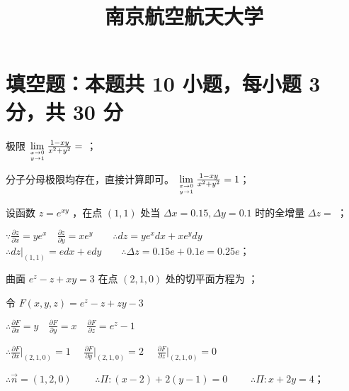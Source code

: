 \documentclass{exam-zh}
\title{南京航空航天大学}
\begin{document}
\maketitle

\section{填空题：本题共 10 小题，每小题 3 分，共 30 分}
\scoringbox

\begin{question}[points = 3]
    极限 $\lim\limits_{x \to 0 \atop y \to 1} \frac{1 - xy}{x^2 + y^2} = $ \fillin[1]；
\end{question}
\begin{solution}
    分子分母极限均存在，直接计算即可。 $\lim\limits_{x \to 0 \atop y \to 1} \frac{1 - xy}{x^2 + y^2} = 1$；
\end{solution}

\begin{question}[points = 3]
    设函数 $z = e^{xy}$ ，在点 $(1, 1)$ 处当 $\Delta x = 0.15, \Delta y = 0.1$ 时的全增量 $\Delta z = $ \fillin[$0.25e$]；
\end{question}
\begin{solution}
    $\because \frac{\partial z}{\partial x} = ye^x \quad \frac{\partial z}{\partial y} = xe^y \qquad
        \therefore dz = ye^xdx + xe^ydy$ \\
    $\therefore dz|_{(1, 1)} = edx + edy \qquad
        \therefore \Delta z = 0.15e + 0.1e = 0.25e$；
\end{solution}

\begin{question}[points = 3]
    曲面 $e^z - z + xy = 3$ 在点 $(2, 1, 0)$ 处的切平面方程为 \fillin[$x + 2y = 4$]；
\end{question}
\begin{solution}
    令 $F\left(x, y, z\right) = e^z - z + zy - 3$

    $\therefore \frac{\partial F}{\partial x} = y \quad \frac{\partial F}{\partial y} = x \quad \frac{\partial F}{\partial z} = e^z - 1$

    $\therefore \frac{\partial F}{\partial x}|_{(2, 1, 0)} = 1 \quad$
    $\frac{\partial F}{\partial y}|_{(2, 1, 0)} = 2 \quad$
    $\frac{\partial F}{\partial z}|_{(2, 1, 0)} = 0$

    $\therefore \vec{n} = (1, 2, 0) \qquad$
    $\therefore \Pi: (x - 2) + 2(y - 1) = 0 \qquad$
    $\therefore \Pi: x + 2y = 4$；
\end{solution}
\end{document}
